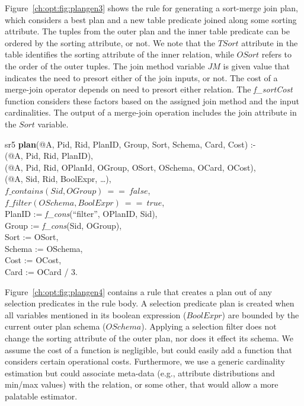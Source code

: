 Figure~\ref{ch:opt:fig:plangen3} shows the rule for generating a sort-merge
join plan, which considers a best plan and a new table predicate joined along
some sorting attribute.  The tuples from the outer plan and the inner table
predicate can be ordered by the sorting attribute, or not.  We note that the
$TSort$ attribute in the  table identifies the sorting attribute
of the inner relation, while $OSort$ refers to the order of the outer tuples.
The join method variable $JM$ is given value that indicates the need to presort
either of the join inputs, or not.  The cost of a merge-join operator depends
on need to presort either relation.  The {\em f\_sortCost} function considers
these factors based on the assigned join method and the input cardinalities.
The output of a merge-join operation includes the join attribute in the $Sort$
variable.

\begin{figure*}
\ssp
\centering
\begin{boxedminipage}{\linewidth}

sr5 {\bf plan}(@A, Pid, Rid, PlanID, Group, Sort, Schema, Card, Cost) :- \\
(@A, Pid, Rid, PlanID),\\
(@A, Pid, Rid, OPlanId, OGroup, OSort, OSchema, OCard, OCost), \\
(@A, Sid, Rid, BoolExpr, \ldots), \\
\datalogspace $f\_contains(Sid, OGroup)\ ==\ false$, \\
\datalogspace $f\_filter(OSchema, BoolExpr)\ ==\ true$, \\
\datalogspace PlanID := {\em f\_cons}(``filter'', OPlanID, Sid), \\
\datalogspace Group  := {\em f\_cons}(Sid, OGroup), \\
\datalogspace Sort   := OSort, \\
\datalogspace Schema := OSchema, \\
\datalogspace Cost   := OCost, \\
\datalogspace Card   := OCard / 3.

\end{boxedminipage}
\caption{\label{ch:opt:fig:plangen4}selection predicate filter plan.}
\end{figure*}

Figure~\ref{ch:opt:fig:plangen4} contains a rule that creates a plan out of any
selection predicates in the rule body.  A selection predicate plan is created
when all variables mentioned in its boolean expression ($BoolExpr$) are bounded
by the current outer plan schema ($OSchema$).  Applying a selection filter does
not change the sorting attribute of the outer plan, nor does it effect its
schema.  We assume the cost of a function is negligible, but could easily add a
function that considers certain operational costs.  Furthermore, we use a
generic cardinality estimation but could associate meta-data (e.g., attribute
distributions and min/max values) with the  relation, or some other,
that would allow a more palatable estimator.

